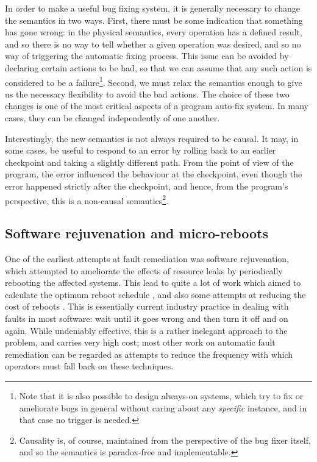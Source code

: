 In order to make a useful bug fixing system, it is generally necessary
to change the semantics in two ways.  First, there must be some
indication that something has gone wrong: in the physical semantics,
every operation has a defined result, and so there is no way to tell
whether a given operation was desired, and so no way of triggering the
automatic fixing process.  This issue can be avoided by declaring
certain actions to be bad, so that we can assume that any such action
is considered to be a failure\footnote{Note that it is also possible
  to design always-on systems, which try to fix or ameliorate bugs in
  general without caring about any \emph{specific} instance, and in
  that case no trigger is needed.}.  Second, we must relax the
semantics enough to give us the necessary flexibility to avoid the bad
actions.  The choice of these two changes is one of the most critical
aspects of a program auto-fix system.  In many cases, they can be
changed independently of one another.

Interestingly, the new semantics is not always required to be causal.
It may, in some cases, be useful to respond to an error by rolling
back to an earlier checkpoint and taking a slightly different path.
From the point of view of the program, the error influenced the
behaviour at the checkpoint, even though the error happened strictly
after the checkpoint, and hence, from the program's perspective, this
is a non-causal semantics\footnote{Causality is, of course, maintained
  from the perspective of the bug fixer itself, and so the semantics
  is paradox-free and implementable.}.

\subsection{Software rejuvenation and micro-reboots}

One of the earliest attempts at fault remediation was software
rejuvenation\cite{Huang1995}, which attempted to ameliorate the
effects of resource leaks by periodically rebooting the affected
systems.  This lead to quite a lot of work which aimed to calculate
the optimum reboot schedule
\cite{Li2002,Vaidyanathan1999,Vaidyanathan2001,Trivedi2000,Garg1998,Garg1995,Garg1998a,Castelli2001}, and also some attempts at reducing the cost of reboots
\cite{Candea2002,Candea2001,Candea,Patterson2002}.  This is
essentially current industry practice in dealing with faults in most
software: wait until it goes wrong and then turn it off and on again.
While undeniably effective, this is a rather inelegant approach to the
problem, and carries very high cost; most other work on automatic
fault remediation can be regarded as attempts to reduce the frequency
with which operators must fall back on these techniques.

